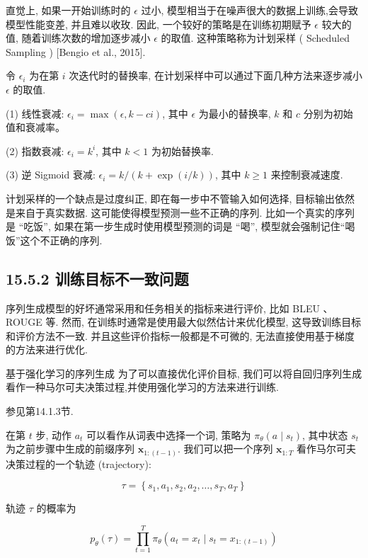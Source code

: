 \documentclass[10pt]{article}
\begin{document}
直觉上, 如果一开始训练时的 $\epsilon$ 过小, 模型相当于在噪声很大的数据上训练,会导致模型性能变差, 并且难以收玫. 因此, 一个较好的策略是在训练初期赋予 $\epsilon$ 较大的值, 随着训练次数的增加逐步减小 $\epsilon$ 的取值. 这种策略称为计划采样 ( Scheduled Sampling ) [Bengio et al., 2015].

令 $\epsilon_{i}$ 为在第 $i$ 次迭代时的替换率, 在计划采样中可以通过下面几种方法来逐步减小 $\epsilon$ 的取值.

(1) 线性衰减: $\epsilon_{i}=\max (\epsilon, k-c i)$, 其中 $\epsilon$ 为最小的替换率, $k$ 和 $c$ 分别为初始值和衰减率。

(2) 指数衰减: $\epsilon_{i}=k^{i}$, 其中 $k<1$ 为初始替换率.

(3) 逆 Sigmoid 衰减: $\epsilon_{i}=k /(k+\exp (i / k))$, 其中 $k \geq 1$ 来控制衰减速度.

计划采样的一个缺点是过度纠正, 即在每一步中不管输入如何选择, 目标输出依然是来自于真实数据. 这可能使得模型预测一些不正确的序列. 比如一个真实的序列是 “吃饭”, 如果在第一步生成时使用模型预测的词是 “喝”, 模型就会强制记住“喝饭”这个不正确的序列.

\subsection*{15.5.2 训练目标不一致问题}
序列生成模型的好坏通常采用和任务相关的指标来进行评价, 比如 BLEU 、 ROUGE 等. 然而, 在训练时通常是使用最大似然估计来优化模型, 这导致训练目标和评价方法不一致. 并且这些评价指标一般都是不可微的, 无法直接使用基于梯度的方法来进行优化.

基于强化学习的序列生成 为了可以直接优化评价目标, 我们可以将自回归序列生成看作一种马尔可夫决策过程,并使用强化学习的方法来进行训练.

参见第14.1.3节.

在第 $t$ 步, 动作 $a_{t}$ 可以看作从词表中选择一个词, 策略为 $\pi_{\theta}\left(a \mid s_{t}\right)$, 其中状态 $s_{t}$ 为之前步骤中生成的前缀序列 $\boldsymbol{x}_{1:(t-1)}$. 我们可以把一个序列 $\boldsymbol{x}_{1: T}$ 看作马尔可夫决策过程的一个轨迹 (trajectory):


\begin{equation*}
\tau=\left\{s_{1}, a_{1}, s_{2}, a_{2}, \ldots, s_{T}, a_{T}\right\} \tag{15.43}
\end{equation*}


轨迹 $\tau$ 的概率为


\begin{equation*}
p_{\theta}(\tau)=\prod_{t=1}^{T} \pi_{\theta}\left(a_{t}=x_{t} \mid s_{t}=x_{1:(t-1)}\right) \tag{15.44}
\end{equation*}
\end{document}
